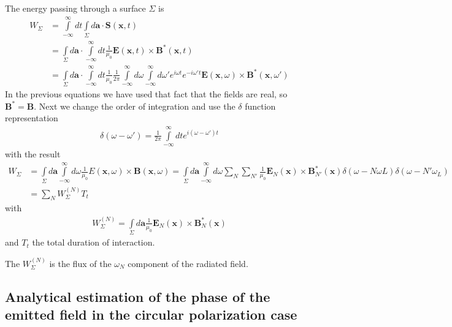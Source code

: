 The  energy passing through a surface $\Sigma$ is
\begin{align}
    W_{\Sigma} & =\int\limits_{-\infty}^\infty dt \int\limits_\Sigma d{\bm a}\cdot{\bm S}({\bm x},t)\nonumber                                                                                                                                                                \\
               & = \int\limits_\Sigma d{\bm a}\cdot\int\limits_{-\infty}^\infty dt\frac1{\mu_0}{\bm E({\bm x},t)}\times{\bm B}^*({\bm x},t)\nonumber                                                                                                                         \\
               & = \int\limits_\Sigma d{\bm a}\cdot\int\limits_{-\infty}^\infty dt\frac1{\mu_0}\frac1{2\pi}\int \limits_{-\infty}^\infty d\omega \int \limits_{-\infty}^\infty d\omega' e^{i\omega t} e^{-i\omega' t}{\bm E({\bm x},\omega)}\times{\bm B}^*({\bm x},\omega')
\end{align}
In the previous equations we have used that fact that the fields are real, so ${\bm B}^*={\bm B}$. Next we change the order of integration and use the $\delta$ function representation
\begin{align}
    \delta(\omega-\omega')=\frac1{2\pi}\int\limits_{-\infty}^{\infty} dt e^{i(\omega-\omega')t}
\end{align}
with the result
\begin{align}
    W_{\Sigma} & =\int\limits_{\Sigma} d{\bm a}\int\limits_{-\infty}^{\infty} d\omega \frac1{\mu_0}E({\bm x},\omega)\times{\bm B}({\bm x},\omega)=\int\limits_{\Sigma} d{\bm a}\int\limits_{-\infty}^{\infty} d\omega \sum\limits_{N}\sum\limits_{N'}\frac1{\mu_0}{\bm E}_N({\bm x})\times{\bm B}^*_{N'}({\bm x})\delta(\omega-N\omega L)\delta(\omega-N'\omega_L)\nonumber \\
               & =\sum\limits_N W^{(N)}_{\Sigma} T_t
\end{align}
with
\begin{align}
    W^{(N)}_\Sigma = \int\limits_{\Sigma} d{\bm a}\frac1{\mu_0} {\bm E}_N({\bm x})\times{\bm B}^*_N({\bm x})
\end{align}
and $T_t$ the total duration of interaction.

The $W^{(N)}_\Sigma$ is the flux of the $\omega_N$ component of the radiated field.


\subsection{Analytical estimation of the phase of the emitted field in the circular polarization case}


